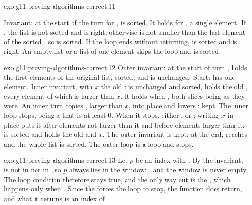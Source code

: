\begin{solution}{exo:g11:proving-algorithms-correct:11}
\smallskip\noindent\hspace*{2em}

\noindent\hspace*{4em}

\noindent\hspace*{6em}

\noindent\hspace*{8em}

\noindent\hspace*{4em}

\smallskip\noindent Invariant: at the start of the turn for ,  is sorted. It holds for
, a single element. If , the list is not sorted and  is right;
otherwise  is not smaller than the last element of the sorted , so  is sorted.
If the loop ends without returning,  is sorted and  is right. An empty list or a list of
one element skips the loop and is sorted.
\end{solution}

\begin{solution}{exo:g11:proving-algorithms-correct:12}
Outer invariant: at the start of turn ,  holds the first  elements of the original list,
sorted, and  is unchanged. Start:  has one element. Inner invariant, with $x$ the old
:  is unchanged and sorted,  holds the old , every element of
which is larger than $x$. It holds when , both slices being as they were. An inner turn copies
, larger than $x$, into place  and lowers : kept. The inner loop stops,  being a
 that is at least $0$. When it stops, either , or ; writing $x$ in place
 puts it after elements not larger than it and before elements larger than it:  is sorted and
holds the old  and $x$. The outer invariant is kept; at the end,  reaches  and the whole
list is sorted. The outer loop is a  loop and stops.
\end{solution}

\begin{solution}{exo:g11:proving-algorithms-correct:13}
Let $p$ be an index with . By the invariant,  is not in  nor in , so
$p$ always lies in the window: , and the window is never empty. The loop condition 
therefore stays true, and the only way out is the , which happens only when . Since
the   forces the loop to stop, the function does return, and what it returns is an index of
.
\end{solution}

